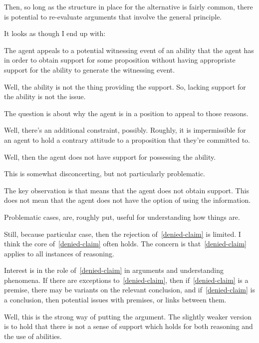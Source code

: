 Then, so long as the structure in place for the alternative is fairly common, there is potential to re-evaluate arguments that involve the general principle.


\begin{note}
  It looks as though I end up with:

  The agent appeals to a potential witnessing event of an ability that the agent has in order to obtain support for some proposition without having appropriate support for the ability to generate the witnessing event.

  Well, the ability is not the thing providing the support.
  So, lacking support for the ability is not the issue.

  The question is about why the agent is in a position to appeal to those reasons.

  Well, there's an additional constraint, possibly.
  Roughly, it is impermissible for an agent to hold a contrary attitude to a proposition that they're committed to.

  Well, then the agent does not have support for possessing the ability.

  This is somewhat disconcerting, but not particularly problematic.

  The key observation is that \nI{} means that the agent does not obtain support.
  This does not mean that the agent does not have the option of using the information.
\end{note}

\newpage



Problematic cases, are, roughly put, useful for understanding how things are.

Still, because particular case, then the rejection of~\ref{denied-claim} is limited.
I think the core of~\ref{denied-claim} often holds.
The concern is that~\ref{denied-claim} applies to all instances of reasoning.

Interest is in the role of~\ref{denied-claim} in arguments and understanding phenomena.
If there are exceptions to~\ref{denied-claim}, then if~\ref{denied-claim} is a premise, there may be variants on the relevant conclusion, and if~\ref{denied-claim} is a conclusion, then potential issues with premises, or links between them.




Well, this is the strong way of putting the argument.
The slightly weaker version is to hold that there is not a sense of support which holds for both reasoning and the use of abilities.

